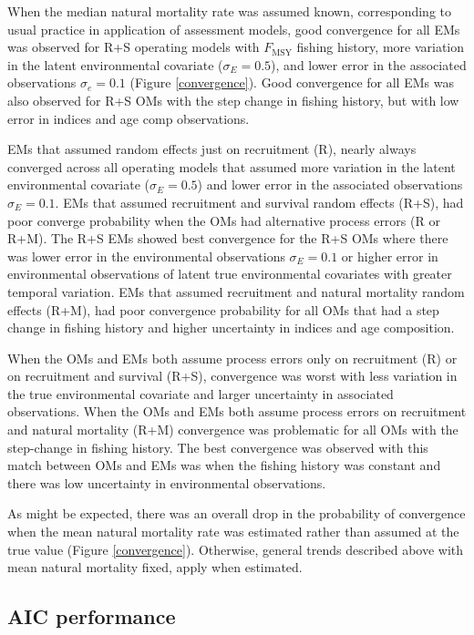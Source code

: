 \documentclass[
  12pt,
]{article}
\newcommand{\Fmsy}{\ensuremath{F_{\text{MSY}}}\xspace}
\begin{document}
When the median natural mortality rate was assumed known, corresponding to usual practice in application of assessment models, good convergence for all EMs was observed for R+S operating models with \Fmsy fishing history, more variation in the latent environmental covariate (\(\sigma_E = 0.5\)), and lower error in the associated observations \(\sigma_e = 0.1\) (Figure \ref{convergence}). Good convergence for all EMs was also observed for R+S OMs with the step change in fishing history, but with low error in indices and age comp observations.

EMs that assumed random effects just on recruitment (R), nearly always converged across all operating models that assumed more variation in the latent environmental covariate (\(\sigma_E = 0.5\)) and lower error in the associated observations \(\sigma_E = 0.1\). EMs that assumed recruitment and survival random effects (R+S), had poor converge probability when the OMs had alternative process errors (R or R+M). The R+S EMs showed best convergence for the R+S OMs where there was lower error in the environmental observations \(\sigma_E = 0.1\) or higher error in environmental observations of latent true environmental covariates with greater temporal variation. EMs that assumed recruitment and natural mortality random effects (R+M), had poor convergence probability for all OMs that had a step change in fishing history and higher uncertainty in indices and age composition.

When the OMs and EMs both assume process errors only on recruitment (R) or on recruitment and survival (R+S), convergence was worst with less variation in the true environmental covariate and larger uncertainty in associated observations. When the OMs and EMs both assume process errors on recruitment and natural mortality (R+M) convergence was problematic for all OMs with the step-change in fishing history. The best convergence was observed with this match between OMs and EMs was when the fishing history was constant and there was low uncertainty in environmental observations.

As might be expected, there was an overall drop in the probability of convergence when the mean natural mortality rate was estimated rather than assumed at the true value (Figure \ref{convergence}). Otherwise, general trends described above with mean natural mortality fixed, apply when estimated.

\hypertarget{aic-performance}{%
\subsection*{AIC performance}\label{aic-performance}}
\end{document}
